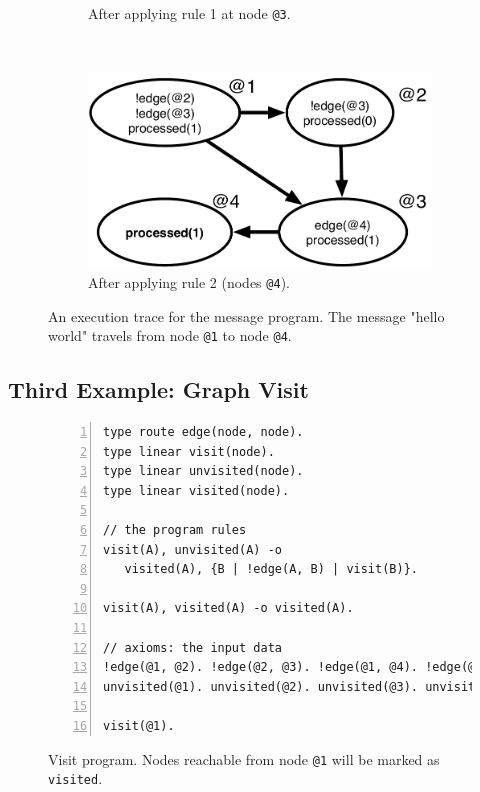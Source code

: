 \begin{figure}[h]
\begin{subfigure}[b]{0.5\textwidth}
                \caption{After applying rule 1 at node \texttt{@3}.}
                \label{fig:message_trace3}
        \end{subfigure}%
        ~
        \begin{subfigure}[b]{0.5\textwidth}
                  \includegraphics[width=\textwidth]{figures/message/message_trace4}
                  \caption{After applying rule 2 (nodes \texttt{@4}).}
                  \label{fig:message_trace4}
          \end{subfigure}
        \caption{An execution trace for the message program. The message "hello
        world" travels from node \texttt{@1} to node \texttt{@4}.}\label{fig:message_trace}
\end{figure}

\subsection{Third Example: Graph Visit}

\begin{figure}[h!]
\scriptsize\begin{Verbatim}[numbers=left]
type route edge(node, node).
type linear visit(node).
type linear unvisited(node).
type linear visited(node).

// the program rules
visit(A), unvisited(A) -o
   visited(A), {B | !edge(A, B) | visit(B)}.

visit(A), visited(A) -o visited(A).

// axioms: the input data
!edge(@1, @2). !edge(@2, @3). !edge(@1, @4). !edge(@2, @4).
unvisited(@1). unvisited(@2). unvisited(@3). unvisited(@4).

visit(@1).
\end{Verbatim}
  \caption{Visit program. Nodes reachable from node \texttt{@1} will be marked
     as \texttt{visited}.}
  \label{code:visit}
\end{figure}
\normalsize

